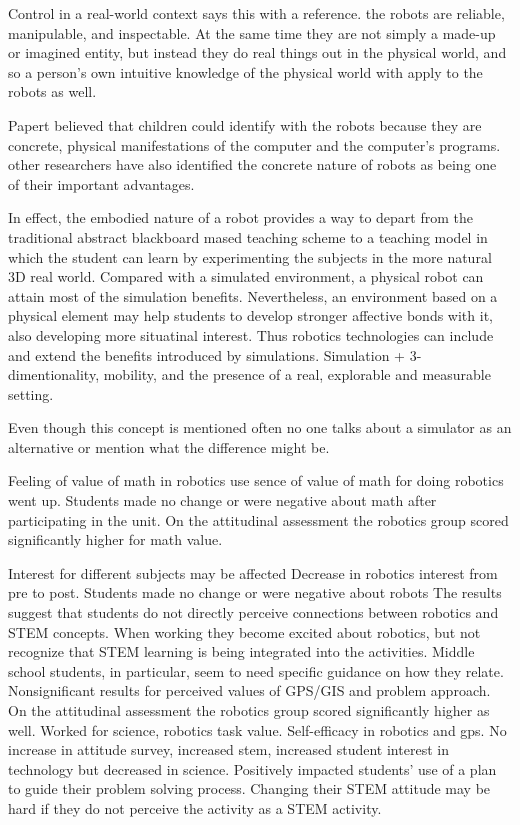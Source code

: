 \bigskip\noindent
Control in a real-world context
\cite{silk2011resources} says this with a reference. the robots are reliable, manipulable, and inspectable. At the same time they are not simply a made-up or imagined entity, but instead they do real things out in the physical world, and so a person's own intuitive knowledge of the physical world with apply to the robots as well. 

\cite{barker2007robotics} Papert believed that children could identify with the robots because they are concrete, physical manifestations of the computer and the computer's programs. other researchers have also identified the concrete nature of robots as being one of their important advantages. 

\cite{mitnik2009collaborative} In effect, the embodied nature of a robot provides a way to depart from the traditional abstract blackboard mased teaching scheme to a teaching model in which the student can learn by experimenting the subjects in the more natural 3D real world. Compared with a simulated environment, a physical robot can attain most of the simulation benefits. Nevertheless, an environment based on a physical element may help students to develop stronger affective bonds with it, also developing more situatinal interest. Thus robotics technologies can include and extend the benefits introduced by simulations. Simulation + 3-dimentionality, mobility, and the presence of a real, explorable and measurable setting. 

Even though this concept is mentioned often no one talks about a simulator as an alternative or mention what the difference might be. 

\bigskip\noindent
Feeling of value of math in robotics use
\cite{silk2011resources} sence of value of math for doing robotics went up. 
\cite{silk2011resources}Students made no change or were negative about math after participating in the unit. 
\cite{nugent2009use} On the attitudinal assessment the robotics group scored significantly higher for math value.

\bigskip\noindent
Interest for different subjects may be affected
\cite{silk2011resources} Decrease in robotics interest from pre to post. 
\cite{silk2011resources} Students made no change or were negative about robots
\cite{nugent2008effect} The results suggest that students do not directly perceive connections between robotics and STEM concepts. When working they become excited about robotics, but not recognize that STEM learning is being integrated into the activities. Middle school students, in particular, seem to need specific guidance on how they relate. 
\cite{nugent2009use} Nonsignificant results for perceived values of GPS/GIS and problem approach.
\cite{nugent2009use}On the attitudinal assessment the robotics group scored significantly higher as well. Worked for science, robotics task value. Self-efficacy in robotics and gps. 
\cite{nugent2008effect} No increase in attitude survey, increased stem, increased student interest in technology but decreased in science. Positively impacted students' use of a plan to guide their problem solving process. Changing their STEM attitude may be hard if they do not perceive the activity as a STEM activity.

